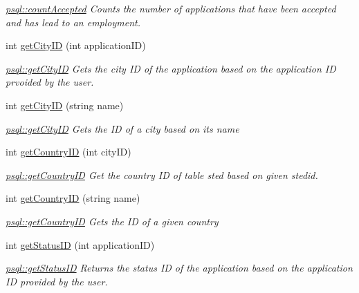 \begin{DoxyCompactItemize}
\begin{DoxyCompactList}\small\item\em \mbox{\hyperlink{classpsql_a0beec2f098edc0961f27774cdd54d09b}{psql\+::count\+Accepted}} Counts the number of applications that have been accepted and has lead to an employment. \end{DoxyCompactList}\item 
int \mbox{\hyperlink{classpsql_af3462a12dc106e0ca8df4fa8fcf28436}{get\+City\+ID}} (int application\+ID)
\begin{DoxyCompactList}\small\item\em \mbox{\hyperlink{classpsql_af3462a12dc106e0ca8df4fa8fcf28436}{psql\+::get\+City\+ID}} Gets the city ID of the application based on the application ID prvoided by the user. \end{DoxyCompactList}\item 
int \mbox{\hyperlink{classpsql_a0c33b3f48064ba75abaa4b0b58eb1ccd}{get\+City\+ID}} (string name)
\begin{DoxyCompactList}\small\item\em \mbox{\hyperlink{classpsql_af3462a12dc106e0ca8df4fa8fcf28436}{psql\+::get\+City\+ID}} Gets the ID of a city based on its name \end{DoxyCompactList}\item 
int \mbox{\hyperlink{classpsql_a81d02dc0350ba11d90257914078ba432}{get\+Country\+ID}} (int city\+ID)
\begin{DoxyCompactList}\small\item\em \mbox{\hyperlink{classpsql_a81d02dc0350ba11d90257914078ba432}{psql\+::get\+Country\+ID}} Get the country ID of table sted based on given stedid. \end{DoxyCompactList}\item 
int \mbox{\hyperlink{classpsql_a9a7069491b2a8d6c986339a13619ef6a}{get\+Country\+ID}} (string name)
\begin{DoxyCompactList}\small\item\em \mbox{\hyperlink{classpsql_a81d02dc0350ba11d90257914078ba432}{psql\+::get\+Country\+ID}} Gets the ID of a given country \end{DoxyCompactList}\item 
int \mbox{\hyperlink{classpsql_a9c02c92c09cb60c35d24375673b7df06}{get\+Status\+ID}} (int application\+ID)
\begin{DoxyCompactList}\small\item\em \mbox{\hyperlink{classpsql_a9c02c92c09cb60c35d24375673b7df06}{psql\+::get\+Status\+ID}} Returns the status ID of the application based on the application ID provided by the user. \end{DoxyCompactList}\item 

\end{DoxyCompactItemize}
